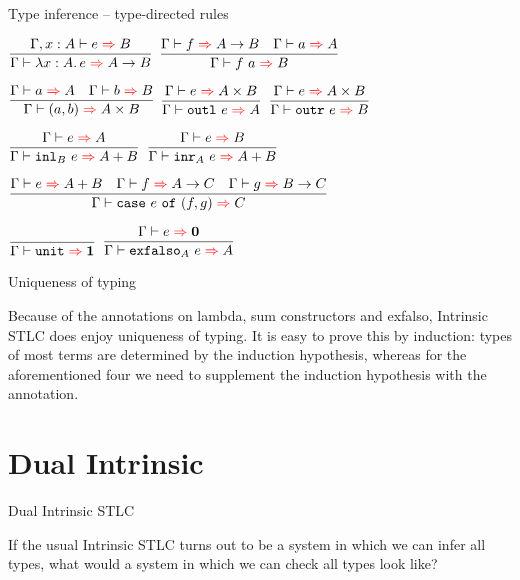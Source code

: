 \documentclass{beamer}
\begin{document}
\begin{frame}{Type inference -- type-directed rules}

\begin{center}
  $\infrule{\fullinfer{\extend{\Gamma}{x}{A}}{e}{B}}{\infer{\ifun{x}{A}{e}}{\Fun{A}{B}}}$ \quad
  $\infrule{\infer{f}{\Fun{A}{B}} \quad \infer{a}{A}}{\infer{\app{f}{a}}{B}}$

  \vspace{2em}

  $\infrule{\infer{a}{A} \quad \infer{b}{B}}{\infer{\pair{a}{b}}{\Prod{A}{B}}}$ \quad
  $\infrule{\infer{e}{\Prod{A}{B}}}{\infer{\outl{e}}{A}}$ \quad
  $\infrule{\infer{e}{\Prod{A}{B}}}{\infer{\outr{e}}{B}}$

  \vspace{2em}

  $\infrule{\infer{e}{A}}{\infer{\iinl{B}{e}}{\Sum{A}{B}}}$ \quad
  $\infrule{\infer{e}{B}}{\infer{\iinr{A}{e}}{\Sum{A}{B}}}$

  \vspace{2em}

  $\infrule{\infer{e}{\Sum{A}{B}} \quad \infer{f}{\Fun{A}{C}} \quad \infer{g}{\Fun{B}{C}}}{\infer{\case{e}{f}{g}}{C}}$

  \vspace{2em}

  $\infrule{}{\infer{\unit}{\Unit}}$ \quad
  $\infrule{\infer{e}{\Empty}}{\infer{\iexfalso{A}{e}}{A}}$
\end{center}

\end{frame}

\begin{frame}{Uniqueness of typing}

Because of the annotations on lambda, sum constructors and exfalso, Intrinsic STLC does enjoy uniqueness of typing. It is easy to prove this by induction: types of most terms are determined by the induction hypothesis, whereas for the aforementioned four we need to supplement the induction hypothesis with the annotation.

\end{frame}

\section{Dual Intrinsic}


\begin{frame}{Dual Intrinsic STLC}

If the usual Intrinsic STLC turns out to be a system in which we can infer all types, what would a system in which we can check all types look like?

\end{frame}
\end{document}

